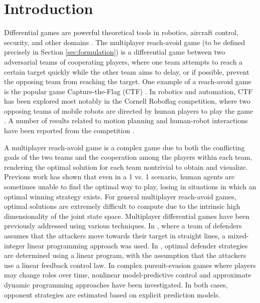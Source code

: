 \section{Introduction}
\label{sec:intro}
Differential games are powerful theoretical tools in robotics, aircraft control, security, and other domains \cite{OFTHEAIRFORCEWASHINGTON:2009p37, Erzberger:2006p44, kiva2009}. The multiplayer reach-avoid game (to be defined precisely in Section \ref{sec:formulation}) is a differential game between two adversarial teams of cooperating players, where one team attempts to reach a certain target quickly while the other team aims to delay, or if possible, prevent the opposing team from reaching the target. One example of a reach-avoid game is the popular game Capture-the-Flag (CTF) \cite{HThesis, Huang2011}. In robotics and automation, CTF has been explored most notably in the Cornell Roboflag competition, where two opposing teams of mobile robots are directed by human players to play the game \cite{DAndrea:2003p95}. A number of results related to motion planning and human-robot interactions have been reported from the competition \cite{Earl:2007p101, Campbell:2003p5, Waydo:2003p97, Parasuraman:2005p99}. 

A multiplayer reach-avoid game is a complex game due to both the conflicting goals of the two teams and the cooperation among the players within each team, rendering the optimal solution for each team nontrivial to obtain and visualize. Previous work \cite{HThesis, Huang2011} has shown that even in a 1 vs. 1 scenario, human agents are sometimes unable to find the optimal way to play, losing in situations in which an optimal winning strategy exists. For general multiplayer reach-avoid games, optimal solutions are extremely difficult to compute due to the intrinsic high dimensionality of the joint state space. Multiplayer differential games have been previously addressed using various techniques. In \cite{Earl:2007p101}, where a team of defenders assumes that the attackers move towards their target in straight lines, a mixed-integer linear programming approach was used. In \cite{Chasparis:2005p102}, optimal defender strategies are determined using a linear program, with the assumption that the attackers use a linear feedback control law. In complex pursuit-evasion games where players may change roles over time, nonlinear model-predictive control \cite{Sprinkle:2004p100} and approximate dynamic programming \cite{McGrew:2008p103} approaches have been investigated. In both cases, opponent strategies are estimated based on explicit prediction models.

